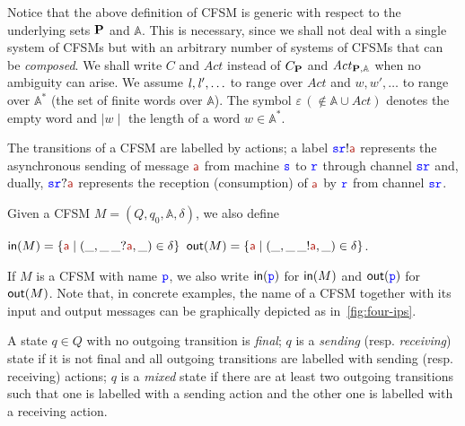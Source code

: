 Notice that the above definition of CFSM is generic with respect to the underlying sets
$\mathbf{P}$ and $\mathbb{A}$.
This is necessary,  since we shall not deal with a single system of CFSMs but with an arbitrary number of  systems of CFSMs that can be {\em composed}.
We shall write $C$ and $\mathit{Act}$ instead of $C_{\mathbf{P}}$ and $\mathit{Act}_{\mathbf{P},\mathbb{A}}$ when no ambiguity can arise.
 We assume $\mathit{l},\mathit{l}',\ldots$ to range over $\textit{Act}$
and $w,w',\ldots$ to range over $\mathbb{A}^*$ (the set of finite words over $\mathbb{A}$).
The symbol $\varepsilon\,(\notin \mathbb{A}\cup\textit{Act})$ denotes the empty word and 
$\mid w\mid$ the length of a word $w\in \mathbb{A}^*$.



The transitions of a CFSM are labelled by actions; a label $\tts\ttr!\msg[a]$ represents
the asynchronous sending of message $\msg[a]$ from machine ${\mathtt{\color{blue}{ {s}}}}$ to ${\mathtt{\color{blue}{ {r}}}}$ through channel ${\mathtt{\color{blue}{ {s}}}}{\mathtt{\color{blue}{ {r}}}}$ and, dually,
$\tts\ttr?\msg[a]$ represents the reception (consumption) of $\msg[a]$ by ${\mathtt{\color{blue}{ {r}}}}$ from channel
${\mathtt{\color{blue}{ {s}}}}{\mathtt{\color{blue}{ {r}}}}$. 

 Given a CFSM $M=(Q,q_0,\mathbb{A},\delta)$,
we also define \\
\centerline{$\inn{M}=\Set{\msg[a] \mid (\_,\_\,\_?\msg[a],\_)\in \delta }$
\quad {}\quad $\outt{M}=\Set{\msg[a] \mid (\_,\_\,\_!\msg[a],\_)\in \delta }$.}
 If $M$ is a CFSM with name ${\mathtt{\color{blue}{ {p}}}}$, we also write $\mathsf{in}({\mathtt{\color{blue}{ {p}}}})$ for $\mathsf{in}(M)$ and
 $\mathsf{out}({\mathtt{\color{blue}{ {p}}}})$ for $\mathsf{out}(M)$.
  Note that, in concrete examples, the name of a CFSM together with its input and output messages can be graphically depicted as in~\cref{fig:four-ips}. 




A state
$q\in Q$ with no outgoing transition is {\em final}; 
$q$ is a {\em sending} (resp. {\em receiving}) state if it is not final and
all outgoing transitions are labelled with sending (resp. receiving) actions;
$q$  is a {\em mixed} state if there are at least two outgoing transitions such that one is labelled with a sending action and the other one is labelled with a receiving action.



